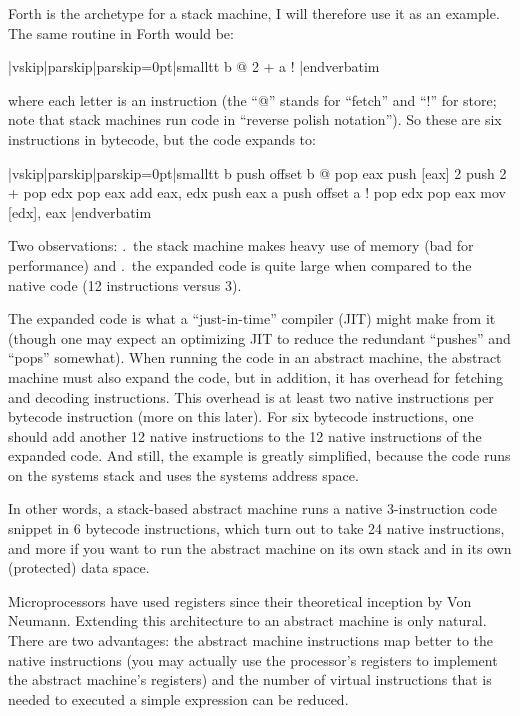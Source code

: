 Forth is the archetype for a stack machine, I will therefore use it as an
example. The same routine in Forth would be:

\verbatim|vskip|parskip|parskip=0pt|smalltt
        b @ 2 + a !
|endverbatim

where each letter is an instruction (the ``@'' stands for ``fetch'' and ``!''
for store; note that stack machines run code in ``reverse polish notation'').
So these are six instructions in bytecode, but the code expands to:

\verbatim|vskip|parskip|parskip=0pt|smalltt
        b       push    offset b
        @       pop     eax
                push    [eax]
        2       push    2
        +       pop     edx
                pop     eax
                add     eax, edx
                push    eax
        a       push    offset a
        !       pop     edx
                pop     eax
                mov     [edx], eax
|endverbatim

Two observations: {.}\ the stack machine makes heavy use of memory (bad
for performance) and {.}\ the expanded code is quite large when
compared to the native code (12 instructions versus 3).

The expanded code is what a ``just-in-time'' compiler (JIT) might make from it
(though one may expect an optimizing JIT to reduce the redundant ``pushes''
and ``pops'' somewhat). When running the code in an abstract machine, the
abstract machine must also expand the code, but in addition, it has overhead
for fetching and decoding instructions. This overhead is at least two native
instructions per bytecode instruction (more on this later). For six bytecode
instructions, one should add another 12 native instructions to the 12 native
instructions of the expanded code. And still, the example is greatly
simplified, because the code runs on the systems stack and uses the systems
address space.

In other words, a stack-based abstract machine runs a native 3-instruction
code snippet in 6 bytecode instructions, which turn out to take 24 native
instructions, and more if you want to run the abstract machine on its own
stack and in its own (protected) data space.

Microprocessors have used registers since their theoretical inception by Von
Neumann. Extending this architecture to an abstract machine is only natural.
There are two advantages: the abstract machine instructions map better to the
native instructions (you may actually use the processor's registers to
implement the abstract machine's registers) and the number of virtual
instructions that is needed to executed a simple expression can be reduced.

